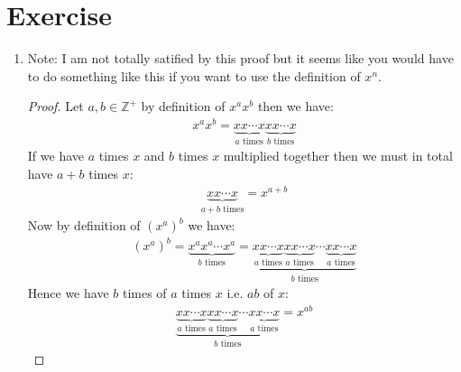 \documentclass{article}
\begin{document}
\section{Exercise}
\begin{enumerate}[label=(\alph*)]
    \item Note: I am not totally satified by this proof but it seems like you
    would have to do something like this if you want to use the definition of
    $x^n$.
    
    \begin{proof}
        Let $a, b \in \mathbb{Z}^+$ by definition of $x^ax^b$ then we have:
        \begin{align*}
            x^ax^b = \underbrace{xx \cdots x}_{a\text{ times}}\underbrace{xx \cdots x}_{b\text{ times}}
        \end{align*}
        If we have $a$ times $x$ and $b$ times $x$ multiplied together then we
        must in total have $a + b$ times $x$:
        \begin{align*}
            \underbrace{xx \cdots x}_{a + b\text{ times}} = x^{a + b}
        \end{align*}
        Now by definition of $(x^a)^b$ we have:
        \begin{align*}
            (x^a)^b = \underbrace{x^ax^a \cdots x^a}_{b \text{ times}} = \underbrace{\underbrace{xx\cdots x}_{a \text{ times}} \underbrace{xx\cdots x}_{a \text{ times}} \cdots \underbrace{xx\cdots x}_{a \text{ times}}}_{b \text{ times}}
        \end{align*}
        Hence we have $b$ times of $a$ times $x$ i.e. $ab$ of $x$:
        \begin{align*}
            \underbrace{\underbrace{xx\cdots x}_{a \text{ times}} \underbrace{xx\cdots x}_{a \text{ times}} \cdots \underbrace{xx\cdots x}_{a \text{ times}}}_{b \text{ times}} = x^{ab}
        \end{align*} 
    \end{proof}
\end{enumerate}
\end{document}
